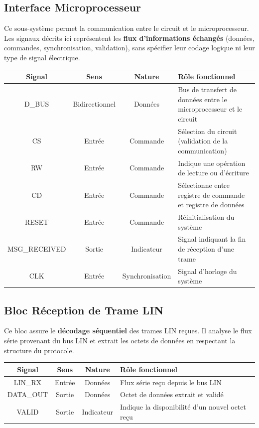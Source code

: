 \subsection{Interface Microprocesseur}

Ce sous-système permet la communication entre le circuit et le microprocesseur.  
Les signaux décrits ici représentent les \textbf{flux d’informations échangés} (données, commandes, synchronisation, validation), 
sans spécifier leur codage logique ni leur type de signal électrique.

\begin{center}
\renewcommand{\arraystretch}{1.2}
\small
\begin{tabularx}{\textwidth}{|c||c|c|X|}
    \hline			
    \textbf{Signal} & \textbf{Sens} & \textbf{Nature} & \textbf{Rôle fonctionnel}  \\ \hline 
    D\_BUS & Bidirectionnel & Données & Bus de transfert de données entre le microprocesseur et le circuit \\ 
    CS & Entrée & Commande & Sélection du circuit (validation de la communication) \\ 
    RW & Entrée & Commande & Indique une opération de lecture ou d’écriture \\ 
    CD & Entrée & Commande & Sélectionne entre registre de commande et registre de données \\ 
    RESET & Entrée & Commande & Réinitialisation du système \\ 
    MSG\_RECEIVED & Sortie & Indicateur & Signal indiquant la fin de réception d’une trame \\ 
    CLK & Entrée & Synchronisation & Signal d’horloge du système \\ 
    \hline  
\end{tabularx}
\end{center}

\subsection{Bloc Réception de Trame LIN}

Ce bloc assure le \textbf{décodage séquentiel} des trames LIN reçues.  
Il analyse le flux série provenant du bus LIN et extrait les octets de données en respectant la structure du protocole.

\begin{center}
\renewcommand{\arraystretch}{1.2}
\small
\begin{tabularx}{\textwidth}{|c||c|c|X|}
    \hline			
    \textbf{Signal} & \textbf{Sens} & \textbf{Nature} & \textbf{Rôle fonctionnel}  \\ \hline 
    LIN\_RX & Entrée & Données & Flux série reçu depuis le bus LIN \\ 
    DATA\_OUT & Sortie & Données & Octet de données extrait et validé \\ 
    VALID & Sortie & Indicateur & Indique la disponibilité d’un nouvel octet reçu \\ 
    \hline  
\end{tabularx}
\end{center}

